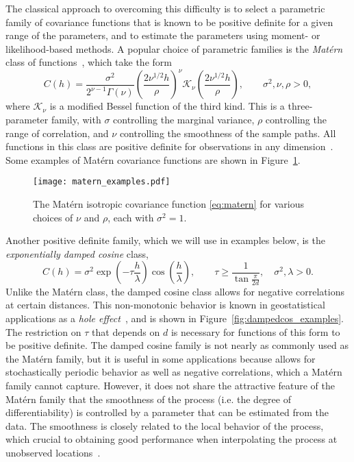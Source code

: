The classical approach to overcoming this difficulty is to select a parametric family of covariance functions that is known to be positive definite for a given range of the parameters, and to estimate the parameters using moment- or likelihood-based methods\cite{gelfand2010handbook}. A popular choice of parametric families is the \emph{Mat\'{e}rn} class of functions~\cite{handcock1994approach}, which take the form
\begin{equation} \label{eq:matern}
C(h) = \frac{\sigma^2}{2^{\nu - 1}\Gamma(\nu)} \left( \frac{2\nu^{1/2}h}{\rho} \right)^{\nu} \mathcal{K}_{\nu} \left( \frac{2\nu^{1/2}h}{\rho} \right), \qquad \sigma^2, \nu, \rho > 0,
\end{equation}
where $\mathcal{K}_\nu$ is a modified Bessel function of the third kind. This is a three-parameter family, with $\sigma$ controlling the marginal variance, $\rho$ controlling the range of correlation, and $\nu$ controlling the smoothness of the sample paths. All functions in this class are positive definite for observations in any dimension~\cite{Stein1999}. Some examples of Mat\'ern covariance functions are shown in Figure~\ref{fig:matern_examples}.


\begin{figure}[!htb]
	\centering
	\texttt{[image: matern\_examples.pdf]}
	\caption{\small The Mat\'ern isotropic covariance function \eqref{eq:matern} for various choices of $\nu$ and $\rho$, each with $\sigma^2 = 1$.}
	\label{fig:matern_examples}
\end{figure}


Another positive definite family, which we will use in examples below, is the \emph{exponentially damped cosine} class, 
\begin{equation} \label{eq:dampedcos}
	C(h) = \sigma^2 \exp \left( -\tau \frac{h}{\lambda} \right) \cos \left( \frac{h}{\lambda} \right), \qquad \tau \geq \frac{1}{\tan \frac{\pi}{2d}}, \quad \sigma^2,\lambda > 0.
\end{equation}
Unlike the Mat\'ern class, the damped cosine class allows for negative correlations at certain distances. This non-monotonic behavior is known in geostatistical applications as a \emph{hole effect}~\cite{Ye2015}, and is shown in Figure~\ref{fig:dampedcos_examples}. The restriction on $\tau$ that depends on $d$ is necessary for functions of this form to be positive definite. %
The damped cosine family is not nearly as commonly used as the Mat\'ern family, but it is useful in some applications because allows for stochastically periodic behavior as well as negative correlations, which a Mat\'ern family cannot capture. However, it does not share the attractive feature of the Mat\'ern family that the smoothness of the process (i.e. the degree of differentiability) is controlled by a parameter that can be estimated from the data. The smoothness is closely related to the local behavior of the process, which crucial to obtaining good performance when interpolating the process at unobserved locations~\cite{Stein1999}.

